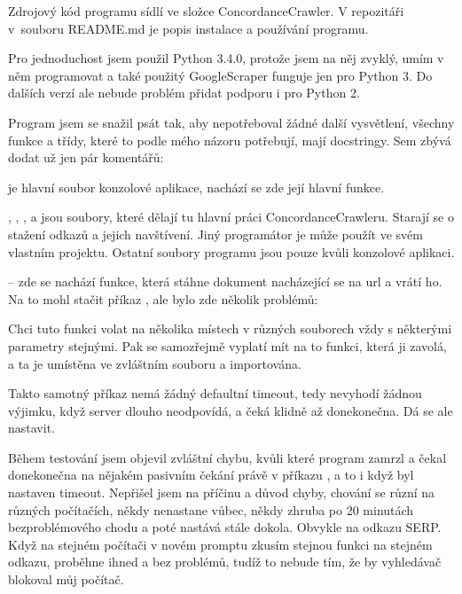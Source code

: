 \bigskip
\centerline{
}
\bigskip

Zdrojový kód programu sídlí ve složce ConcordanceCrawler. V repozitáři
v~souboru README.md je popis instalace a používání programu.

Pro jednoduchost jsem použil Python 3.4.0, protože jsem na něj zvyklý, umím
v něm programovat a také použitý GoogleScraper funguje jen pro Python 3. Do dalších
verzí ale nebude problém přidat podporu i pro Python 2.

Program jsem se snažil psát tak, aby nepotřeboval žádné další vysvětlení,
všechny funkce a třídy, které to podle mého názoru potřebují, mají
docstringy. Sem zbývá dodat už jen pár komentářů:

\bigskip
\itemize{--}
\:  je hlavní soubor konzolové aplikace, nachází se zde její
hlavní funkce.

\:
, , ,  a 
jsou soubory, které dělají tu hlavní práci ConcordanceCrawleru. Starají se
o stažení odkazů a jejich navštívení. Jiný programátor je může použít ve
svém vlastním projektu. Ostatní soubory programu jsou pouze kvůli konzolové
aplikaci.


\od
{} -- zde se nachází funkce, která stáhne dokument
nacházející se na url a vrátí ho. Na to mohl stačit
příkaz , ale bylo zde několik problémů:

\itemize{--}
\:
	Chci tuto funkci volat na několika místech v různých souborech vždy s
	některými parametry stejnými. Pak se samozřejmě vyplatí mít na to funkci,
	která ji zavolá, a ta je umístěna ve zvláštním souboru a importována.

\:
	Takto samotný příkaz nemá žádný defaultní timeout, tedy nevyhodí žádnou
	výjimku, když server dlouho neodpovídá, a čeká klidně až donekonečna. Dá se ale
	nastavit.

\:
	Během testování jsem objevil zvláštní chybu, kvůli které program zamrzl
	a čekal donekonečna na nějakém pasivním čekání právě v příkazu
	, a to i když byl nastaven timeout.	Nepřišel jsem na příčinu
	a důvod chyby, chování se různí na různých počítačích, někdy nenastane
	vůbec, někdy zhruba po 20 minutách bezproblémového chodu a poté nastává
	stále dokola. Obvykle na odkazu SERP.  Když na stejném počítači v novém
	promptu zkusím stejnou funkci na stejném odkazu, proběhne ihned a bez
	problémů, tudíž to nebude tím, že by vyhledávač blokoval můj počítač.

